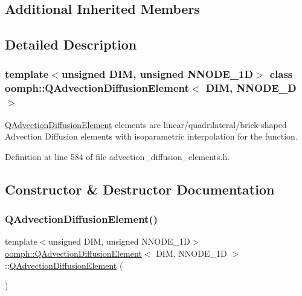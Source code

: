 \subsection*{Additional Inherited Members}


\subsection{Detailed Description}
\subsubsection*{template$<$unsigned D\+IM, unsigned N\+N\+O\+D\+E\+\_\+1D$>$\newline
class oomph\+::\+Q\+Advection\+Diffusion\+Element$<$ D\+I\+M, N\+N\+O\+D\+E\+\_\+D $>$}

\hyperlink{classoomph_1_1QAdvectionDiffusionElement}{Q\+Advection\+Diffusion\+Element} elements are linear/quadrilateral/brick-\/shaped Advection Diffusion elements with isoparametric interpolation for the function. 

Definition at line 584 of file advection\+\_\+diffusion\+\_\+elements.\+h.



\subsection{Constructor \& Destructor Documentation}
\mbox{\label{classoomph_1_1QAdvectionDiffusionElement_a2b1a0c14ece711eee8af18864147e884}} 
\subsubsection{\texorpdfstring{Q\+Advection\+Diffusion\+Element()}{QAdvectionDiffusionElement()}\hspace{0.1cm}{\footnotesize\ttfamily [1/2]}}
{\footnotesize\ttfamily template$<$unsigned D\+IM, unsigned N\+N\+O\+D\+E\+\_\+1D$>$ \\
\hyperlink{classoomph_1_1QAdvectionDiffusionElement}{oomph\+::\+Q\+Advection\+Diffusion\+Element}$<$ D\+IM, N\+N\+O\+D\+E\+\_\+1D $>$\+::\hyperlink{classoomph_1_1QAdvectionDiffusionElement}{Q\+Advection\+Diffusion\+Element} (\begin{DoxyParamCaption}{ }\end{DoxyParamCaption})\hspace{0.3cm}{\ttfamily [inline]}}



